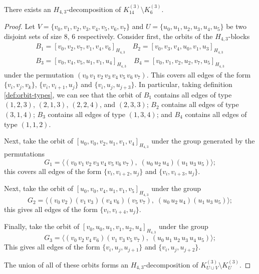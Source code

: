 \begin{subappendices}

\begin{example} \label{eg:H_43-k14-k6}
There exists an $H_{4,3}$-decomposition of $K_{14}^{(3)} \setminus K_{6}^{(3)}$.
\end{example}

\begin{proof}
Let $V = \{v_0, v_1, v_2, v_3, v_4, v_5, v_6, v_7\}$ and $U = \{u_0, u_1, u_2,
u_3, u_4, u_5\}$ be two disjoint sets of size 8, 6 respectively. Consider first, the orbits of the $H_{4,3}$-blocks
\begin{align*}
    B_1 = [v_0, v_2, v_7, v_1, v_4, v_6]_{H_{4,3}} \quad
    B_2 = [v_0, v_3, v_4, u_0, v_1, u_3]_{H_{4,3}} \\
    B_3 = [v_0, v_4, v_5, u_1, v_1, u_4]_{H_{4,3}} \quad
    B_4 = [v_0, v_1, v_2, u_2, v_7, u_5]_{H_{4,3}}
\end{align*}
under the permutation $(v_0 \, v_1 \, v_2 \, v_3 \, v_4 \, v_5 \, v_6 \, v_7)$.
This covers all edges of the form $\{v_i, v_j, v_k\}$, $\{v_i, v_{i+1}, u_j\}$ and $\{v_i, u_j, u_{j+3}\}$.
In particular, taking definition \ref{def:orbit-types},
we can see that the orbit of $B_1$ contains all edges of type $(1, 2, 3)$, $(2, 1, 3)$, $(2, 2, 4)$, and $(2, 3, 3)$;
$B_2$ contains all edges of type $(3, 1, 4)$; $B_3$ contains all edges of type $(1, 3, 4)$; and $B_4$ contains all edges of type $(1, 1, 2)$.

Next, take the orbit of $[u_0, v_0, v_2, u_1, v_1, v_4]_{H_{4,3}}$ under the group generated by the permutations
\[
    G_1 = \langle (v_0 \, v_1 \, v_2 \, v_3 \, v_4 \, v_5 \, v_6 \, v_7),
    \; (u_0 \, u_2 \, u_4) (u_1 \, u_3 \, u_5) \rangle;
\]
this covers all edges of the form $\{v_i, v_{i+2}, u_j\}$ and $\{v_i, v_{i+3}, u_j\}$.

Next, take the orbit of $[u_0, v_0, v_4, u_1, v_1, v_5]_{H_{4,3}}$ under the group
\[
    G_2 = \langle (v_0 \, v_2) (v_1 \, v_3) (v_4 \, v_6) (v_5 \, v_7), \;
    (u_0 \, u_2 \, u_4) (u_1 \, u_3 \, u_5) \rangle;
\]
this gives all edges of the form $\{v_i, v_{i+4}, u_j\}$.

Finally, take the orbit of $[v_0, u_0, u_1, v_1, u_2, u_4]_{H_{4,3}}$ under the group
\[
    G_3 = \langle (v_0 \, v_2 \, v_4 \, v_6) (v_1 \, v_3 \, v_5 \, v_7), \;
    (u_0 \, u_1 \, u_2 \, u_3 \, u_4 \, u_5) \rangle;
\]
This gives all edges of the form $\{v_i, u_j, u_{j+1}\}$ and $\{v_i, u_j, u_{j+2}\}$.

The union of all of these orbits forms an $H_{4,3}$-decomposition of $K_{U \cup
V}^{(3)} \setminus K_{U}^{(3)}$.
\end{proof}


\end{subappendices}
